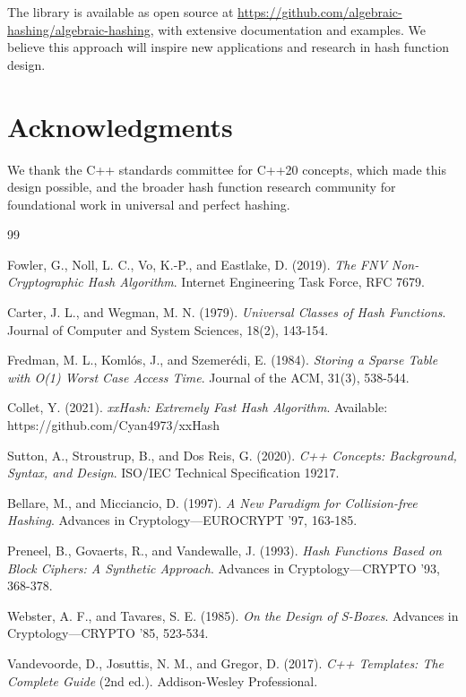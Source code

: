 \documentclass[11pt,a4paper]{article}
\theoremstyle{definition}
\begin{document}
The library is available as open source at \url{https://github.com/algebraic-hashing/algebraic-hashing}, with extensive documentation and examples. We believe this approach will inspire new applications and research in hash function design.

\section*{Acknowledgments}

We thank the C++ standards committee for C++20 concepts, which made this design possible, and the broader hash function research community for foundational work in universal and perfect hashing.

\begin{thebibliography}{99}

Fowler, G., Noll, L. C., Vo, K.-P., and Eastlake, D. (2019).
\textit{The FNV Non-Cryptographic Hash Algorithm}.
Internet Engineering Task Force, RFC 7679.

Carter, J. L., and Wegman, M. N. (1979).
\textit{Universal Classes of Hash Functions}.
Journal of Computer and System Sciences, 18(2), 143-154.

Fredman, M. L., Komlós, J., and Szemerédi, E. (1984).
\textit{Storing a Sparse Table with O(1) Worst Case Access Time}.
Journal of the ACM, 31(3), 538-544.

Collet, Y. (2021).
\textit{xxHash: Extremely Fast Hash Algorithm}.
Available: https://github.com/Cyan4973/xxHash

Sutton, A., Stroustrup, B., and Dos Reis, G. (2020).
\textit{C++ Concepts: Background, Syntax, and Design}.
ISO/IEC Technical Specification 19217.

Bellare, M., and Micciancio, D. (1997).
\textit{A New Paradigm for Collision-free Hashing}.
Advances in Cryptology—EUROCRYPT '97, 163-185.

Preneel, B., Govaerts, R., and Vandewalle, J. (1993).
\textit{Hash Functions Based on Block Ciphers: A Synthetic Approach}.
Advances in Cryptology—CRYPTO '93, 368-378.

Webster, A. F., and Tavares, S. E. (1985).
\textit{On the Design of S-Boxes}.
Advances in Cryptology—CRYPTO '85, 523-534.

Vandevoorde, D., Josuttis, N. M., and Gregor, D. (2017).
\textit{C++ Templates: The Complete Guide} (2nd ed.).
Addison-Wesley Professional.


\end{thebibliography}
\end{document}
